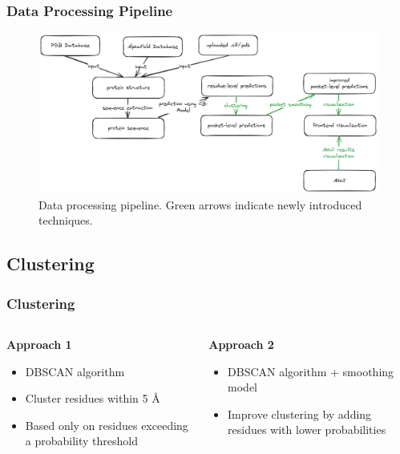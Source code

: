 \documentclass[aspectratio=169]{beamer}
\begin{document}
\begin{frame}
  \frametitle{Data Processing Pipeline}

  \begin{figure}
    \includegraphics[width=\textwidth]{fig/pipeline.png}
    \caption{Data processing pipeline. \textcolor{ITMOdarkgreen}{Green arrows} indicate newly introduced techniques.}
  \end{figure}

\end{frame}

\subsection{Clustering}

\begin{frame}
  \frametitle{Clustering}

  \begin{columns}
    \begin{column}{0.5\textwidth}
      \textbf{Approach 1}
      \begin{itemize}
        \item DBSCAN algorithm
        \item Cluster residues within 5 \AA
        \item Based only on residues exceeding a probability threshold
      \end{itemize}
    \end{column}
    \begin{column}{0.5\textwidth}
      \textbf{Approach 2}
      \begin{itemize}
        \item DBSCAN algorithm + smoothing model
        \item Improve clustering by adding residues with lower probabilities
      \end{itemize}
    \end{column}
  \end{columns}

\end{frame}
\end{document}
